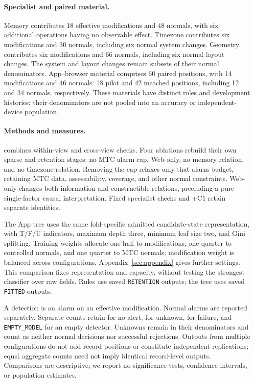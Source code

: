 \paragraph{Specialist and paired material.}
Memory contributes 18 effective modifications and 48 normals, with six additional operations having no observable effect. Timezone contributes six modifications and 30 normals, including six normal system changes. Geometry contributes six modifications and 66 normals, including six normal layout changes. The system and layout changes remain subsets of their normal denominators. App--browser material comprises 60 paired positions, with 14 modifications and 46 normals: 18 pilot and 42 matched positions, including 12 and 34 normals, respectively. These materials have distinct roles and development histories; their denominators are not pooled into an accuracy or independent-device population.

\paragraph{Methods and measures.}
\full combines within-view and cross-view checks. Four ablations rebuild their own sparse and retention stages: no MTC alarm cap, Web-only, no memory relation, and no timezone relation. Removing the cap relaxes only that alarm budget, retaining MTC data, assessability, coverage, and other normal constraints. Web-only changes both information and constructible relations, precluding a pure single-factor causal interpretation. Fixed specialist checks and \full+C1 retain separate identities.

The App tree uses the same fold-specific admitted candidate-state representation, with T/F/U indicators, maximum depth three, minimum leaf size two, and Gini splitting. Training weights allocate one half to modifications, one quarter to controlled normals, and one quarter to MTC normals; modification weight is balanced across configurations. Appendix~\ref{sec:appendix} gives further settings. This comparison fixes representation and capacity, without testing the strongest classifier over raw fields. Rules use saved \texttt{RETENTION} outputs; the tree uses saved \texttt{FITTED} outputs.

A detection is an alarm on an effective modification. Normal alarms are reported separately. Separate counts retain  for no alert,  for unknown,  for failure, and \texttt{EMPTY\_MODEL} for an empty detector. Unknowns remain in their denominators and count as neither normal decisions nor successful rejections. Outputs from multiple configurations do not add record positions or constitute independent replications; equal aggregate counts need not imply identical record-level outputs. Comparisons are descriptive; we report no significance tests, confidence intervals, or population estimates.

